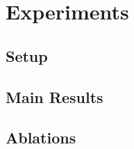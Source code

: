 %

\section{Experiments}
\label{sec:experiments}

\subsection{Setup}
\label{subsec:exp_setup}


\subsection{Main Results}
\label{subsec:exp_main}


\subsection{Ablations}
\label{subsec:exp_ablations}

